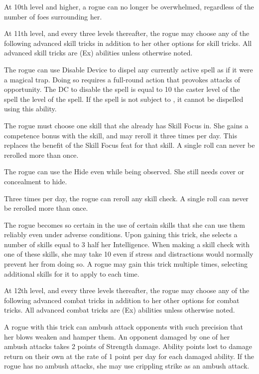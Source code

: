  At 10th level and higher, a rogue can no longer be overwhelmed, regardless of the number of foes surrounding her.

 At 11th level, and every three levels thereafter, the rogue may choose any of the following advanced skill tricks in addition to her other options for skill tricks. All advanced skill tricks are (Ex) abilities unless otherwise noted.

 The rogue can use Disable Device to dispel any currently active spell as if it were a magical trap. Doing so requires a full-round action that provokes attacks of opportunity. The DC to disable the spell is equal to 10 \add the caster level of the spell \add the level of the spell. If the spell is not subject to , it cannot be dispelled using this ability.

 The rogue must choose one skill that she already has Skill Focus in. She gains a  competence bonus with the skill, and may reroll it three times per day. This replaces the benefit of the Skill Focus feat for that skill. A single roll can never be rerolled more than once.

 The rogue can use the Hide even while being observed. She still needs cover or concealment to hide.

 Three times per day, the rogue can reroll any skill check. A single roll can never be rerolled more than once.

 The rogue becomes so certain in the use of certain skills that she can use them reliably even under adverse conditions. Upon gaining this trick, she selects a number of skills equal to 3 \add half her Intelligence. When making a skill check with one of these skills, she may take 10 even if stress and distractions would normally prevent her from doing so. A rogue may gain this trick multiple times, selecting additional skills for it to apply to each time.

 At 12th level, and every three levels thereafter, the rogue may choose any of the following advanced combat tricks in addition to her other options for combat tricks. All advanced combat tricks are (Ex) abilities unless otherwise noted.

 A rogue with this trick can ambush attack opponents with such precision that her blows weaken and hamper them. An opponent damaged by one of her ambush attacks takes 2 points of Strength damage. Ability points lost to damage return on their own at the rate of 1 point per day for each damaged ability. If the rogue has no ambush attacks, she may use crippling strike as an ambush attack.

